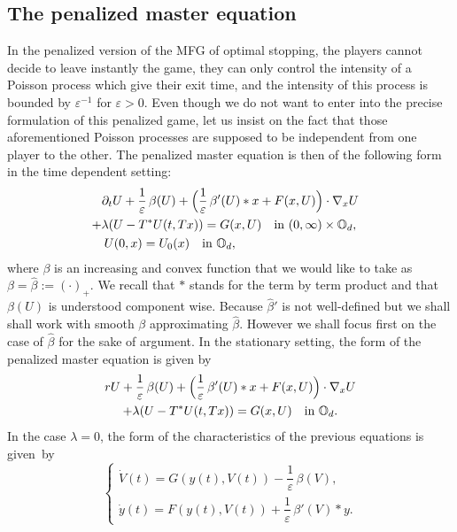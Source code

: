 \documentclass[10pt]{amsart}
\let\epsilon\varepsilon
\theoremstyle{definition}
\begin{document}
\subsection{The penalized master equation}
In the penalized version of the MFG of optimal stopping, the players cannot decide to leave instantly the game, they can only control the intensity of a Poisson process which give their exit time, and the intensity of this process is bounded by $\epsilon^{-1}$ for $\epsilon > 0$. Even though we do not want to enter into the precise formulation of this penalized game, let us insist on the fact that those aforementioned Poisson processes are supposed to be independent from one player to the other. The penalized master equation is then of the following form in the time dependent setting:
\begin{multline}\label{stopme}
\partial_t U+\frac{1}{\epsilon}\,\beta(U)+\Bigl(\frac{1}{\epsilon}\,\beta'(U)*x+F(x,U)\Bigr)\cdot \nabla_xU\\
\shoveright{+ \lambda (U-T^*U(t,Tx))= G(x,U) \quad\text{in } (0,\infty) \times \mathbb{O}_d,}\\
\shoveleft{U(0,x) = U_0(x) \quad\text{in } \mathbb{O}_d,\hfill}
\end{multline}
where $\beta$ is an increasing and convex function that we would like to take as $\beta = \hat{\beta}:= (\cdot)_+$. We recall that $*$ stands for the term by term product and that $\beta(U)$ is understood component wise. Because $\hat{\beta}'$ is not well-defined but we shall shall work with smooth $\beta$ approximating $\hat{\beta}$. However we shall focus first on the case of $\hat{\beta}$ for the sake of argument. In the stationary setting, the form of the penalized master equation is given by
\begin{multline}\label{stopsme1}
r U+\frac{1}{\epsilon}\,\beta(U)+\Bigl(\frac{1}{\epsilon}\,\beta'(U)*x+F(x,U)\Bigr)\cdot \nabla_xU\\
+\lambda (U-T^*U(t,Tx))= G(x,U) \quad\text{in } \mathbb{O}_d.
\end{multline}
In the case $\lambda = 0$, the form of the characteristics of the previous equations is given~by%
\begin{equation}\label{charstop}
\begin{cases}
\dot{V}(t) = G(y(t),V(t))-\dfrac{1}{\epsilon}\,\beta(V),\\[5pt]
\dot{y}(t) = F(y(t),V(t))+\dfrac{1}{\epsilon}\,\beta'(V)*y.
\end{cases}
\end{equation}
\end{document}
